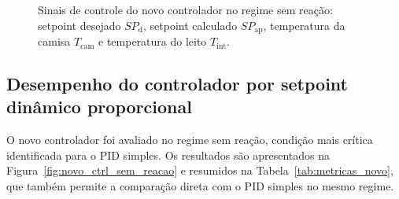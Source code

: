 %
%
%
%

\begin{figure}[ht]
\begin{center}
\caption{Sinais de controle do novo controlador no regime sem reação:
setpoint desejado $SP_{\mathrm{d}}$, setpoint calculado $SP_{\mathrm{ap}}$,
temperatura da camisa $T_{\mathrm{cam}}$ e temperatura do leito $T_{\mathrm{int}}$.}
\label{fig:sinais_novo_ctrl}
\end{center}
\end{figure}

\subsection{Desempenho do controlador por setpoint dinâmico proporcional}

O novo controlador foi avaliado no regime sem reação, condição mais crítica
identificada para o PID simples. Os resultados são apresentados na
Figura~\ref{fig:novo_ctrl_sem_reacao} e resumidos na
Tabela~\ref{tab:metricas_novo}, que também permite a comparação direta com
o PID simples no mesmo regime.

